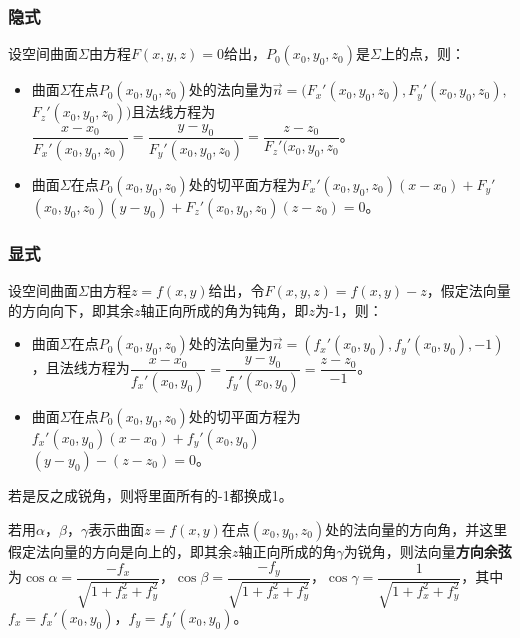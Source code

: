 \paragraph{}

\subsubsection{隐式}

设空间曲面$\varSigma$由方程$F(x,y,z)=0$给出，$P_0(x_0,y_0,z_0)$是$\varSigma$上的点，则：

\begin{itemize}
    \item 曲面$\varSigma$在点$P_0(x_0,y_0,z_0)$处的法向量为$\vec{n}=(F_x'(x_0,y_0,z_0),F_y'(x_0,y_0,z_0),$\\$F_z'(x_0,y_0,z_0))$且法线方程为$\dfrac{x-x_0}{F_x'(x_0,y_0,z_0)}=\dfrac{y-y_0}{F_y'(x_0,y_0,z_0)}=\dfrac{z-z_0}{F_z'(x_0,y_0,z_0}$。
    \item 曲面$\varSigma$在点$P_0(x_0,y_0,z_0)$处的切平面方程为$F_x'(x_0,y_0,z_0)(x-x_0)+F_y'$\\$(x_0,y_0,z_0)(y-y_0)+F_z'(x_0,y_0,z_0)(z-z_0)=0$。
\end{itemize}

\subsubsection{显式}

设空间曲面$\varSigma$由方程$z=f(x,y)$给出，令$F(x,y,z)=f(x,y)-z$，假定法向量的方向向下，即其余$z$轴正向所成的角为钝角，即$z$为-1，则：

\begin{itemize}
    \item 曲面$\varSigma$在点$P_0(x_0,y_0,z_0)$处的法向量为$\vec{n}=(f_x'(x_0,y_0),f_y'(x_0,y_0),-1)$，且法线方程为$\dfrac{x-x_0}{f_x'(x_0,y_0)}=\dfrac{y-y_0}{f_y'(x_0,y_0)}=\dfrac{z-z_0}{-1}$。
    \item 曲面$\varSigma$在点$P_0(x_0,y_0,z_0)$处的切平面方程为$f_x'(x_0,y_0)(x-x_0)+f_y'(x_0,y_0)$\\$(y-y_0)-(z-z_0)=0$。
\end{itemize}

若是反之成锐角，则将里面所有的-1都换成1。

若用$\alpha$，$\beta$，$\gamma$表示曲面$z=f(x,y)$在点$(x_0,y_0,z_0)$处的法向量的方向角，并这里假定法向量的方向是向上的，即其余$z$轴正向所成的角$\gamma$为锐角，则法向量\textbf{方向余弦}为$\cos\alpha=\dfrac{-f_x}{\sqrt{1+f_x^2+f_y^2}}$，$\cos\beta=\dfrac{-f_y}{\sqrt{1+f_x^2+f_y^2}}$，$\cos\gamma=\dfrac{1}{\sqrt{1+f_x^2+f_y^2}}$，其中$f_x=f_x'(x_0,y_0)$，$f_y=f_y'(x_0,y_0)$。

